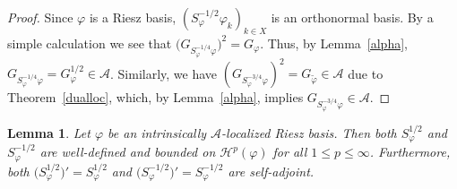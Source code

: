 \documentclass{amsart}
\newtheorem{lem.}[theorem]{Lemma}
\def\Hil{\mathcal{H}}
\newcommand{\A}[0]{{\mathcal{A}}}
\begin{document}
\begin{proof}
Since $\varphi$ is a Riesz basis, $(S_{\varphi}^{-1/2}\varphi_k)_{k\in X}$ is an orthonormal basis. By a simple calculation we see that $\big(G_{S_{\varphi}^{-1/4}\varphi}\big)^2 = G_{\varphi}$. Thus, by Lemma~\ref{alpha}, $G_{S_{\varphi}^{-1/4}\varphi} = G_{\varphi}^{1/2}\in \A$. Similarly, we have $(G_{S_\varphi^{-3/4}\varphi})^2=G_{\widetilde\varphi} \in \A$ due to Theorem~\ref{dualloc}, which, by Lemma~\ref{alpha}, implies $G_{S_\varphi^{-3/4}\varphi}\in\mathcal{A}$.
\end{proof}

\begin{lem.}\label{powers-of-S}
Let $\varphi$ be an intrinsically $\A$-localized Riesz basis. Then both $S_{\varphi}^{1/2}$ and $S_{\varphi}^{-1/2}$ are well-defined and bounded on $\Hil^p(\varphi)$ for all $1\leq p \leq \infty$. Furthermore, both $\big(S_{\varphi}^{1/2}\big)' = S_{\varphi}^{1/2}$ and $\big(S_{\varphi}^{-1/2}\big)' = S_{\varphi}^{-1/2}$ are self-adjoint.
\end{lem.}
\end{document}
